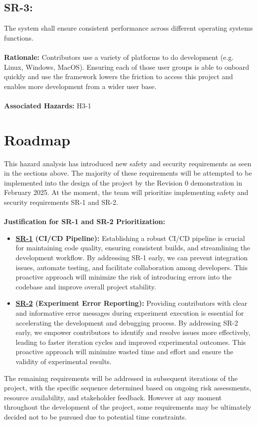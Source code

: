 \documentclass{article}
\begin{document}
\subsection*{SR-3:}
\label{SR-3}
The system shall ensure consistent performance across different operating systems functions. \\ \\
\textbf{Rationale:} Contributors use a variety of platforms to do development (e.g. Linux, Windows, MacOS). Ensuring each of those user groups is able to onboard quickly and use the framework lowers the friction to access this project and enables more development from a wider user base. \\ \\
\textbf{Associated Hazards:} H3-1


\section{Roadmap}

This hazard analysis has introduced new safety and security requirements as seen in the sections above. The majority of these requirements will be attempted to be implemented into the design of the project by the Revision 0 demonstration in February 2025. At the moment, the team will prioritize implementing safety and security requirements SR-1 and SR-2.
\\\\
\textbf{Justification for SR-1 and SR-2 Prioritization:}
\begin{itemize}
    \item \textbf{\hyperref[SR-1]{SR-1} (CI/CD Pipeline):} Establishing a robust CI/CD pipeline is crucial for maintaining code quality, ensuring consistent builds, and streamlining the development workflow. By addressing SR-1 early, we can prevent integration issues, automate testing, and facilitate collaboration among developers. This proactive approach will minimize the risk of introducing errors into the codebase and improve overall project stability.
    \item \textbf{\hyperref[SR-2]{SR-2} (Experiment Error Reporting):} Providing contributors with clear and informative error messages during experiment execution is essential for accelerating the development and debugging process. By addressing SR-2 early, we empower contributors to identify and resolve issues more effectively, leading to faster iteration cycles and improved experimental outcomes. This proactive approach will minimize wasted time and effort and ensure the validity of experimental results.
\end{itemize}
The remaining requirements will be addressed in subsequent iterations of the project, with the specific sequence determined based on ongoing risk assessments, resource availability, and stakeholder feedback. However at any moment throughout the development of the project, some requirements may be ultimately decided not to be pursued due to potential time constraints.
\end{document}
